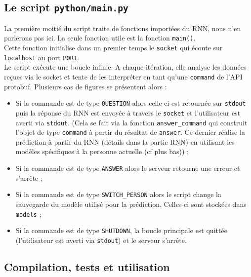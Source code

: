 \documentclass[10pt,a4paper]{article}
\newcommand\tab[1][0.5cm]{\hspace*{#1}}
\begin{document}
\subsection{Le script \texttt{python/main.py}}
La première moitié du script traite de fonctions importées du RNN, nous n'en parlerons pas ici. La seule fonction utile est la fonction \texttt{main()}. \\
\tab Cette fonction initialise dans un premier temps le \texttt{socket} qui écoute sur \texttt{localhost} au port \texttt{PORT}.\\
\tab Le script exécute une boucle infinie. A chaque itération, elle analyse les données reçues via le socket et tente de les interpréter en tant qu'une \texttt{command} de l'API protobuf. Plusieurs cas de figures se présentent alors :
\begin{itemize}
\item Si la commande est de type \texttt{QUESTION} alors celle-ci est retournée sur \texttt{stdout} puis la réponse du RNN est envoyée à travers le \texttt{socket} et l'utilisateur est averti via \texttt{stdout}. (Cela se fait via la fonction \texttt{answer\_command} qui construit l'objet de type \texttt{command} à partir du résultat de \texttt{answer}. Ce dernier réalise la prédiction à partir du RNN (détails dans la partie RNN) en utilisant les modèles spécifiques à la personne actuelle (cf plus bas)) ;
\item Si la commande est de type \texttt{ANSWER} alors le serveur retourne une erreur et s'arrête ;
\item Si la commande est de type \texttt{SWITCH\_PERSON} alors le script change la sauvegarde du modèle utilisé pour la prédiction. Celles-ci sont stockées dans \texttt{models} ;
\item Si la commande est de type \texttt{SHUTDOWN}, la boucle principale est quittée (l'utilisateur est averti via \texttt{stdout}) et le serveur s'arrête. 
\end{itemize}
\subsection{Compilation, tests et utilisation}
\end{document}
